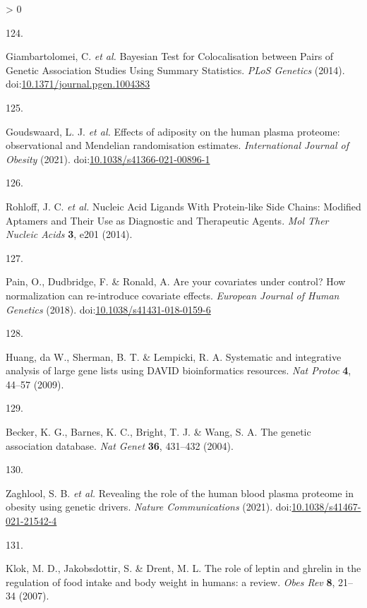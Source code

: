 \documentclass[11pt,twoside]{bristolthesis}
\newlength{\cslhangindent}
\newlength{\csllabelwidth}
\newenvironment{CSLReferences}[2] %
 {%
  \setlength{\parindent}{0pt}
  \ifodd #1 \everypar{\setlength{\hangindent}{\cslhangindent}}\ignorespaces\fi
  \ifnum #2 > 0
  \setlength{\parskip}{#2\baselineskip}
  \fi
 }%
 {}
\newcommand{\CSLLeftMargin}[1]{\parbox[t]{\csllabelwidth}{#1}}
\newcommand{\CSLRightInline}[1]{\parbox[t]{\linewidth - \csllabelwidth}{#1}\break}
\begin{document}
\begin{CSLReferences}{0}{0}
\leavevmode\hypertarget{ref-Giambartolomei2014}{}%
\CSLLeftMargin{124. }
\CSLRightInline{Giambartolomei, C. \emph{et al.} {Bayesian Test for Colocalisation between Pairs of Genetic Association Studies Using Summary Statistics}. \emph{PLoS Genetics} (2014). doi:\href{https://doi.org/10.1371/journal.pgen.1004383}{10.1371/journal.pgen.1004383}}

\leavevmode\hypertarget{ref-Goudswaard2021}{}%
\CSLLeftMargin{125. }
\CSLRightInline{Goudswaard, L. J. \emph{et al.} {Effects of adiposity on the human plasma proteome: observational and Mendelian randomisation estimates}. \emph{International Journal of Obesity} (2021). doi:\href{https://doi.org/10.1038/s41366-021-00896-1}{10.1038/s41366-021-00896-1}}

\leavevmode\hypertarget{ref-Rohloff2014}{}%
\CSLLeftMargin{126. }
\CSLRightInline{Rohloff, J. C. \emph{et al.} {Nucleic Acid Ligands With Protein-like Side Chains: Modified Aptamers and Their Use as Diagnostic and Therapeutic Agents}. \emph{Mol Ther Nucleic Acids} \textbf{3}, e201 (2014).}

\leavevmode\hypertarget{ref-Pain2018}{}%
\CSLLeftMargin{127. }
\CSLRightInline{Pain, O., Dudbridge, F. \& Ronald, A. {Are your covariates under control? How normalization can re-introduce covariate effects}. \emph{European Journal of Human Genetics} (2018). doi:\href{https://doi.org/10.1038/s41431-018-0159-6}{10.1038/s41431-018-0159-6}}

\leavevmode\hypertarget{ref-Huang2009}{}%
\CSLLeftMargin{128. }
\CSLRightInline{Huang, da W., Sherman, B. T. \& Lempicki, R. A. {Systematic and integrative analysis of large gene lists using DAVID bioinformatics resources}. \emph{Nat Protoc} \textbf{4}, 44--57 (2009).}

\leavevmode\hypertarget{ref-Becker2004a}{}%
\CSLLeftMargin{129. }
\CSLRightInline{Becker, K. G., Barnes, K. C., Bright, T. J. \& Wang, S. A. {The genetic association database}. \emph{Nat Genet} \textbf{36}, 431--432 (2004).}

\leavevmode\hypertarget{ref-Zaghlool2021}{}%
\CSLLeftMargin{130. }
\CSLRightInline{Zaghlool, S. B. \emph{et al.} {Revealing the role of the human blood plasma proteome in obesity using genetic drivers}. \emph{Nature Communications} (2021). doi:\href{https://doi.org/10.1038/s41467-021-21542-4}{10.1038/s41467-021-21542-4}}

\leavevmode\hypertarget{ref-Klok2007}{}%
\CSLLeftMargin{131. }
\CSLRightInline{Klok, M. D., Jakobsdottir, S. \& Drent, M. L. {The role of leptin and ghrelin in the regulation of food intake and body weight in humans: a review}. \emph{Obes Rev} \textbf{8}, 21--34 (2007).}


\end{CSLReferences}
\end{document}
